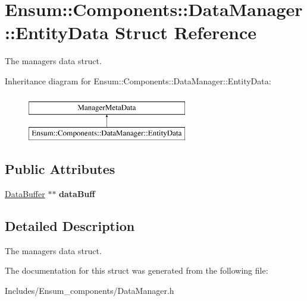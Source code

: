 \hypertarget{struct_ensum_1_1_components_1_1_data_manager_1_1_entity_data}{}\section{Ensum\+:\+:Components\+:\+:Data\+Manager\+:\+:Entity\+Data Struct Reference}
\label{struct_ensum_1_1_components_1_1_data_manager_1_1_entity_data}


The managers data struct.  


Inheritance diagram for Ensum\+:\+:Components\+:\+:Data\+Manager\+:\+:Entity\+Data\+:\begin{figure}[H]
\begin{center}
\leavevmode
\includegraphics[height=2.000000cm]{struct_ensum_1_1_components_1_1_data_manager_1_1_entity_data}
\end{center}
\end{figure}
\subsection*{Public Attributes}
\begin{DoxyCompactItemize}
\item 
\hyperlink{struct_ensum_1_1_components_1_1_data_manager_1_1_data_buffer}{Data\+Buffer} $\ast$$\ast$ {\bfseries data\+Buff}\hypertarget{struct_ensum_1_1_components_1_1_data_manager_1_1_entity_data_aaab508d0e5ef00b27e1ec6f58b397657}{}\label{struct_ensum_1_1_components_1_1_data_manager_1_1_entity_data_aaab508d0e5ef00b27e1ec6f58b397657}

\end{DoxyCompactItemize}


\subsection{Detailed Description}
The managers data struct. 

The documentation for this struct was generated from the following file\+:\begin{DoxyCompactItemize}
\item 
Includes/\+Ensum\+\_\+components/Data\+Manager.\+h\end{DoxyCompactItemize}
